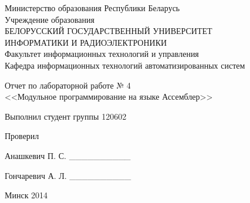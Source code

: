 \thispagestyle{empty}
\setlength{\parindent}{0ex} %

\begin{center}
  Министерство образования Республики Беларусь \\
  \vspace{0.5ex}
  Учреждение образования \\
  БЕЛОРУССКИЙ ГОСУДАРСТВЕННЫЙ УНИВЕРСИТЕТ \\
  ИНФОРМАТИКИ И РАДИОЭЛЕКТРОНИКИ \\
  \vspace{0.5ex}
  Факультет информационных технологий и управления \\
  \vspace{0.5ex}
  Кафедра информационных технологий автоматизированных систем
\end{center}

\vspace{50mm}

\begin{center}
  Отчет по лабораторной работе № 4 \\
  <<Модульное программирование на языке Ассемблер>>
\end{center}

\vspace{60mm}

\begin{minipage}{.55\linewidth}
    Выполнил студент группы 120602

    \smallskip

    Проверил
\end{minipage}
\hfill
\begin{minipage}{.4\linewidth}
  \begin{flushright}
    Анашкевич П. С. \_\_\_\_\_\_\_\_\_\_

    \smallskip

    Гончаревич А. Л. \_\_\_\_\_\_\_\_\_\_
  \end{flushright}
\end{minipage}

\vspace{50mm}
\begin{center}
  Минск 2014
\end{center}

\setlength{\parindent}{1.25cm} %

\newpage
